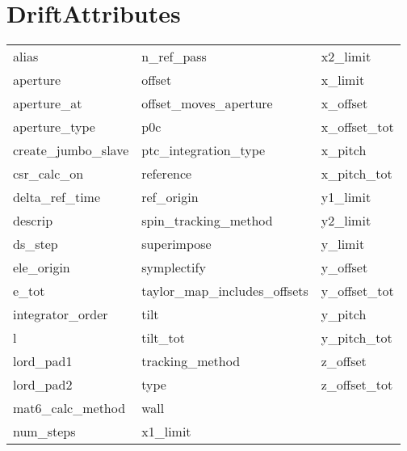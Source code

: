  \section{DriftAttributes}
 \label{s:list.drift}
 
 \begin{tabular}{lll} \toprule
alias                       & n_ref_pass                  & x2_limit                    \\
aperture                    & offset                      & x_limit                     \\
aperture_at                 & offset_moves_aperture       & x_offset                    \\
aperture_type               & p0c                         & x_offset_tot                \\
create_jumbo_slave          & ptc_integration_type        & x_pitch                     \\
csr_calc_on                 & reference                   & x_pitch_tot                 \\
delta_ref_time              & ref_origin                  & y1_limit                    \\
descrip                     & spin_tracking_method        & y2_limit                    \\
ds_step                     & superimpose                 & y_limit                     \\
ele_origin                  & symplectify                 & y_offset                    \\
e_tot                       & taylor_map_includes_offsets & y_offset_tot                \\
integrator_order            & tilt                        & y_pitch                     \\
l                           & tilt_tot                    & y_pitch_tot                 \\
lord_pad1                   & tracking_method             & z_offset                    \\
lord_pad2                   & type                        & z_offset_tot                \\
mat6_calc_method            & wall                        &                             \\
num_steps                   & x1_limit                    &                             \\
 \bottomrule
 \end{tabular}
 \vfill
 
